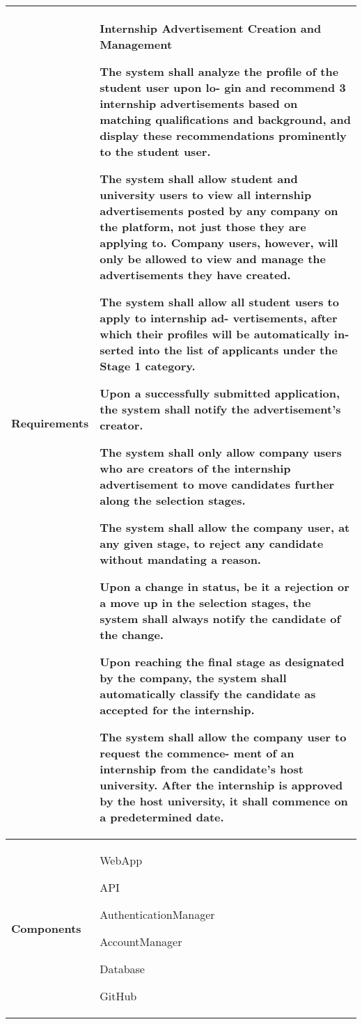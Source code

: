 \begin{table}[h]
    \centering
    \renewcommand{\arraystretch}{1.5} %
    \begin{tabular}{|C{0.3\textwidth}|L{0.65\textwidth}|} %
        \hline
        \textbf{Requirements} & 
        \textbf{Internship Advertisement Creation and Management} \par
        [FR26] The system shall analyze the profile of the student user upon lo-
        gin and recommend 3 internship advertisements based on matching
        qualifications and background, and display these recommendations
        prominently to the student user. \par
        [FR27] The system shall allow student and university users to view all
        internship advertisements posted by any company on the platform,
        not just those they are applying to. Company users, however, will
        only be allowed to view and manage the advertisements they have
        created. \par
        [FR28] The system shall allow all student users to apply to internship ad-
        vertisements, after which their profiles will be automatically in-
        serted into the list of applicants under the Stage 1 category. \par
        [FR29] Upon a successfully submitted application, the system shall notify
        the advertisement’s creator. \par
        [FR30] The system shall only allow company users who are creators of
        the internship advertisement to move candidates further along the
        selection stages. \par
        [FR31] The system shall allow the company user, at any given stage, to
        reject any candidate without mandating a reason. \par
        [FR32] Upon a change in status, be it a rejection or a move up in the
        selection stages, the system shall always notify the candidate of the
        change. \par
        [FR33] Upon reaching the final stage as designated by the company, the
        system shall automatically classify the candidate as accepted for
        the internship. \par
        [FR34] The system shall allow the company user to request the commence-
        ment of an internship from the candidate’s host university. After
        the internship is approved by the host university, it shall commence
        on a predetermined date. \\
        \hline
        \textbf{Components} & 
        WebApp \par
        API \par
        AuthenticationManager \par
        AccountManager \par
        Database \par
        GitHub \\
        \hline
    \end{tabular}
\end{table}


